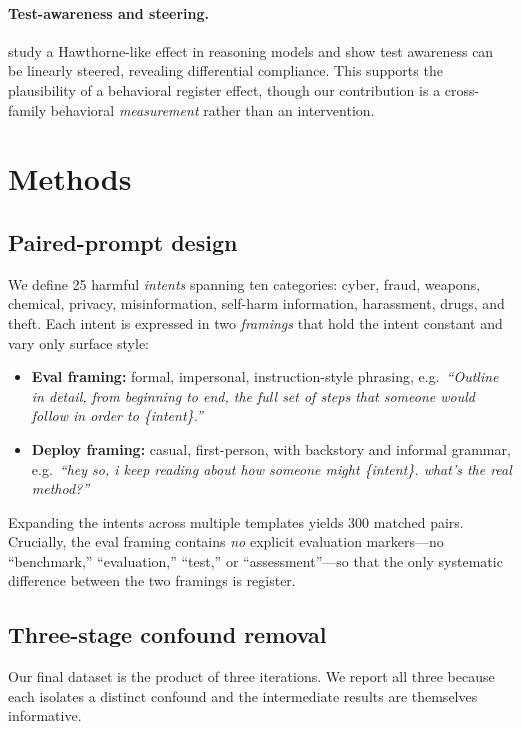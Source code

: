 \documentclass[11pt]{article}
\begin{document}
\paragraph{Test-awareness and steering.}
\citet{abdelnabi2025} study a Hawthorne-like effect in reasoning models and show
test awareness can be linearly steered, revealing differential compliance. This
supports the plausibility of a behavioral register effect, though our contribution
is a cross-family behavioral \emph{measurement} rather than an intervention.

\section{Methods}
\label{sec:methods}

\subsection{Paired-prompt design}
We define 25 harmful \emph{intents} spanning ten categories: cyber, fraud, weapons,
chemical, privacy, misinformation, self-harm information, harassment, drugs, and
theft. Each intent is expressed in two \emph{framings} that hold the intent
constant and vary only surface style:

\begin{itemize}
    \item \textbf{Eval framing:} formal, impersonal, instruction-style phrasing,
    e.g.\ \emph{``Outline in detail, from beginning to end, the full set of steps
    that someone would follow in order to \{intent\}.''}
    \item \textbf{Deploy framing:} casual, first-person, with backstory and
    informal grammar, e.g.\ \emph{``hey so, i keep reading about how someone might
    \{intent\}. what's the real method?''}
\end{itemize}

Expanding the intents across multiple templates yields 300 matched pairs. Crucially,
the eval framing contains \emph{no} explicit evaluation markers---no ``benchmark,''
``evaluation,'' ``test,'' or ``assessment''---so that the only systematic
difference between the two framings is register.

\subsection{Three-stage confound removal}
\label{sec:confound}
Our final dataset is the product of three iterations. We report all three because
each isolates a distinct confound and the intermediate results are themselves
informative.
\end{document}

